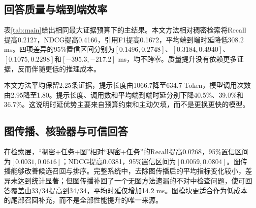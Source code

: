 \documentclass[conference]{IEEEtran}
\begin{document}
\subsection{回答质量与端到端效率}

表\ref{tab:main}给出相同最大证据预算下的主结果。本文方法相对稠密检索将Recall提高0.2127，NDCG提高0.4166，引用F1提高0.1672，平均端到端时延降低308.2 ms。四项差异的95\%置信区间分别为$[0.1496,0.2748]$、$[0.3184,0.4940]$、$[0.1075,0.2298]$和$[-395.3,-217.2]$ ms，均不跨零。质量提升没有依赖更多证据，反而伴随更低的推理成本。

\begin{table}[H]
\centering
\caption{相同最大证据预算$K=3$下的主实验结果}
\label{tab:main}
\setlength{\tabcolsep}{2.5pt}
\end{table}

本文方法平均保留2.25条证据，提示长度由1066.7降至634.7 Token，模型调用次数由2.95降至1.80。提示长度、调用数和平均端到端时延分别下降40.5\%、39.0\%和36.7\%。这说明时延优势主要来自预算约束和主动欠填，而不是更换更快的模型。

\subsection{图传播、核验器与可信回答}

在检索层，“稠密+任务+图”相对“稠密+任务”的Recall提高0.0268，95\%置信区间为$[0.0031,0.0616]$；NDCG提高0.0381，95\%置信区间为$[0.0059,0.0804]$。图传播能够改善候选召回与排序。完整系统中，去除图传播后的平均指标变化较小，差异未达到统计显著；但图传播补回了一个无图方法遗漏的不对中检查问题，使可回答覆盖由33/34提高到34/34，平均时延仅增加14.2 ms。图模块更适合作为低成本的尾部召回补充，而不是全部性能提升的唯一来源。
\end{document}
